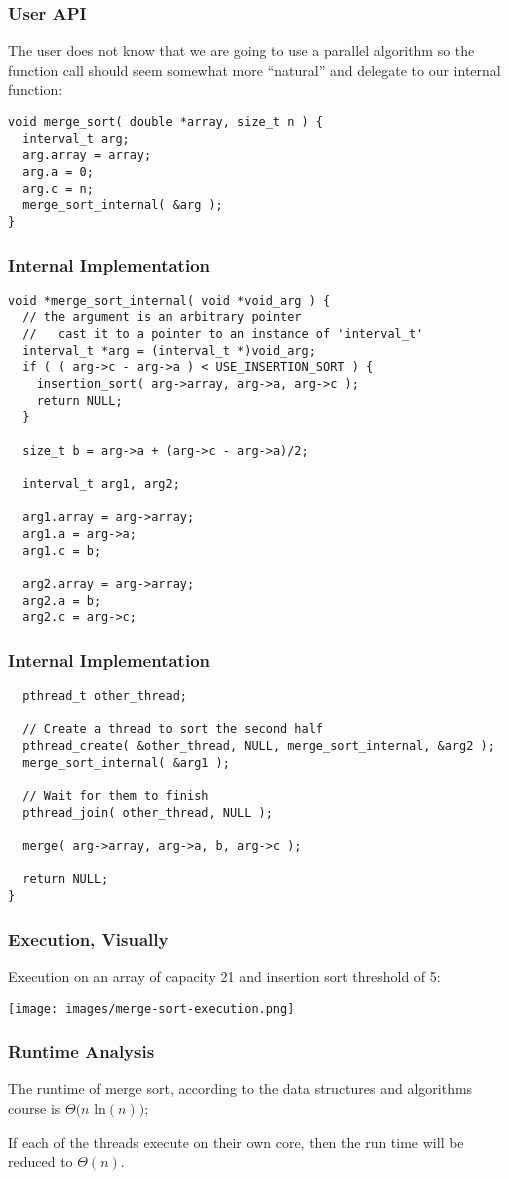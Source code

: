 \begin{frame}[fragile]
\frametitle{User API}

The user does not know that we are going to use a parallel algorithm so the function call should seem somewhat more ``natural'' and delegate to our internal function: 

\begin{verbatim}
void merge_sort( double *array, size_t n ) {
  interval_t arg;
  arg.array = array;
  arg.a = 0;
  arg.c = n;
  merge_sort_internal( &arg );
}
\end{verbatim}

\end{frame}

\begin{frame}[fragile]
\frametitle{Internal Implementation}

{\scriptsize
\begin{verbatim}
void *merge_sort_internal( void *void_arg ) {
  // the argument is an arbitrary pointer
  //   cast it to a pointer to an instance of 'interval_t'
  interval_t *arg = (interval_t *)void_arg;
  if ( ( arg->c - arg->a ) < USE_INSERTION_SORT ) {
    insertion_sort( arg->array, arg->a, arg->c );
    return NULL;
  }
  
  size_t b = arg->a + (arg->c - arg->a)/2;
  
  interval_t arg1, arg2;
  
  arg1.array = arg->array;
  arg1.a = arg->a;
  arg1.c = b;
  
  arg2.array = arg->array;
  arg2.a = b;
  arg2.c = arg->c;
\end{verbatim}
}
\end{frame}

\begin{frame}[fragile]
\frametitle{Internal Implementation}

{\scriptsize
\begin{verbatim}
  pthread_t other_thread;

  // Create a thread to sort the second half
  pthread_create( &other_thread, NULL, merge_sort_internal, &arg2 ); 
  merge_sort_internal( &arg1 );
  
  // Wait for them to finish
  pthread_join( other_thread, NULL );

  merge( arg->array, arg->a, b, arg->c );

  return NULL;
}
\end{verbatim}
}
\end{frame}

\begin{frame}
\frametitle{Execution, Visually}

Execution on an array of capacity 21 and insertion sort threshold of 5:

\begin{center}
	\texttt{[image: images/merge-sort-execution.png]}
\end{center}
\end{frame}

\begin{frame}
\frametitle{Runtime Analysis}


The runtime of merge sort, according to the data structures and algorithms course is $\Theta(n$ ln$(n))$;

If each of the threads execute on their own core, then the run time will be reduced to $\Theta(n)$.

\end{frame}





